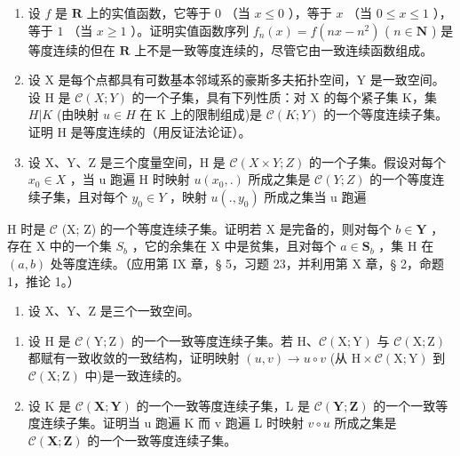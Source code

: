 \ExerciseSection

\begin{enumerate}
\def\labelenumi{\arabic{enumi})}
\item
  设 \(f\) 是 \(\mathbf{R}\) 上的实值函数，它等于 \(0\) （当 \(x \leqslant 0\) ），等于 \(x\) （当 \(0 \leqslant x \leqslant 1\) ），等于 \(1\) （当 \(x \geqslant 1\) ）。证明实值函数序列 \(f_n(x) = f(nx - n^2)\) ( \(n \in \mathbf{N}\) ) 是等度连续的但在 \(\mathbf{R}\) 上不是一致等度连续的，尽管它由一致连续函数组成。
\item
  设 X 是每个点都具有可数基本邻域系的豪斯多夫拓扑空间，Y 是一致空间。设 H 是 \(\mathcal{C}(X;Y)\) 的一个子集，具有下列性质：对 X 的每个紧子集 K，集 \(H|K\) (由映射 \(u\in H\) 在 K 上的限制组成)是 \(\mathcal{C}(K;Y)\) 的一个等度连续子集。证明 H 是等度连续的（用反证法论证）。
\item
  设 X、Y、Z 是三个度量空间，H 是 \(\mathcal{C}(X \times Y; Z)\) 的一个子集。假设对每个 \(x_{0} \in X\) ，当 u 跑遍 H 时映射 \(u(x_{0}, .)\) 所成之集是 \(\mathcal{C}(Y; Z)\) 的一个等度连续子集，且对每个 \(y_{0} \in Y\) ，映射 \(u(., y_{0})\) 所成之集当 u 跑遍
\end{enumerate}

H 时是 \(\mathcal{C}\) (X; Z) 的一个等度连续子集。证明若 X 是完备的，则对每个 \(b \in \mathbf{Y}\) ，存在 X 中的一个集 \(S_b\) ，它的余集在 X 中是贫集，且对每个 \(a \in \mathbf{S}_b\) ，集 H 在 \((a, b)\) 处等度连续。（应用第 IX 章，§ 5，习题 23，并利用第 X 章，§ 2，命题 1，推论 1。）

\begin{enumerate}
\def\labelenumi{\arabic{enumi})}
\setcounter{enumi}{3}
\tightlist
\item
  设 X、Y、Z 是三个一致空间。
\end{enumerate}

\begin{enumerate}
\def\labelenumi{\alph{enumi})}
\item
  设 H 是 \(\mathcal{C}(\mathrm{Y};\mathrm{Z})\) 的一个一致等度连续子集。若 H、\(\mathcal{C}(\mathrm{X};\mathrm{Y})\) 与 \(\mathcal{C}(\mathrm{X};\mathrm{Z})\) 都赋有一致收敛的一致结构，证明映射 \((u,v)\to u\circ v\) (从 \(\mathrm{H}\times \mathcal{C}(\mathrm{X};\mathrm{Y})\) 到 \(\mathcal{C}(\mathrm{X};\mathrm{Z})\) 中)是一致连续的。
\item
  设 K 是 \(\mathcal{C}(\mathbf{X};\mathbf{Y})\) 的一个一致等度连续子集，L 是 \(\mathcal{C}(\mathbf{Y};\mathbf{Z})\) 的一个一致等度连续子集。证明当 u 跑遍 K 而 v 跑遍 L 时映射 \(v \circ u\) 所成之集是 \(\mathcal{C}(\mathbf{X};\mathbf{Z})\) 的一个一致等度连续子集。
\end{enumerate}

